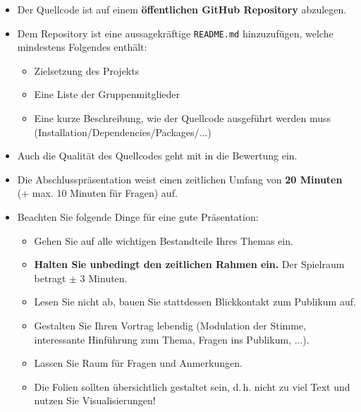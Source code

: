 \begin{frame}
	\begin{itemize}
		\item Der Quellcode ist auf einem \textbf{öffentlichen GitHub Repository} abzulegen.
		\item Dem Repository ist eine aussagekräftige \texttt{README.md} hinzuzufügen, welche mindestens Folgendes enthält:
		\begin{itemize}
			\item Zielsetzung des Projekts
			\item Eine Liste der Gruppenmitglieder
			\item Eine kurze Beschreibung, wie der Quellcode ausgeführt werden muss (Installation/Dependencies/Packages/...)
		\end{itemize}
		\item Auch die Qualität des Quellcodes geht mit in die Bewertung ein.
	\end{itemize}
	
\end{frame}


\begin{frame}
	\begin{itemize}
		\item Die Abschlusspräsentation weist einen zeitlichen Umfang von \textbf{20 Minuten} (+ max. 10 Minuten für Fragen) auf.
		\item Beachten Sie folgende Dinge für eine gute Präsentation:
		\begin{itemize}
			\item Gehen Sie auf alle wichtigen Bestandteile Ihres Themas ein.
			\item \textbf{Halten Sie unbedingt den zeitlichen Rahmen ein.} Der Spielraum betragt $\pm$ 3 Minuten.
			\item Lesen Sie nicht ab, bauen Sie stattdessen Blickkontakt zum Publikum auf.
			\item Gestalten Sie Ihren Vortrag lebendig (Modulation der Stimme, interessante Hinführung zum Thema, Fragen ins Publikum, ...).
			\item Lassen Sie Raum für Fragen und Anmerkungen.
			\item Die Folien sollten übersichtlich gestaltet sein, d.\,h. nicht zu viel Text und nutzen Sie Visualisierungen!
		\end{itemize}
	\end{itemize}
\end{frame}


